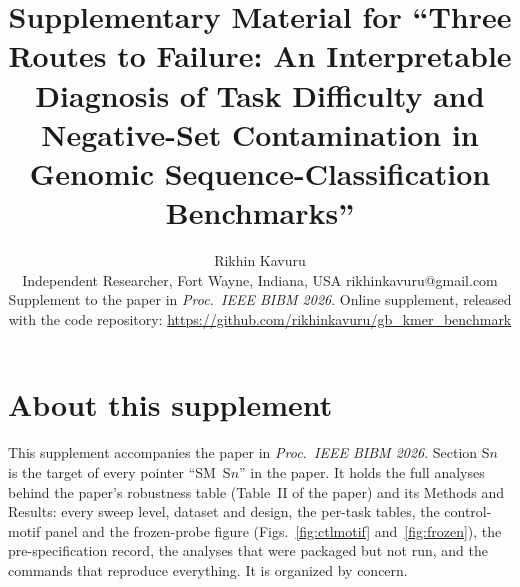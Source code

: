 \documentclass[journal,onecolumn,10pt,letterpaper]{IEEEtran}
\newcommand{\smurl}{\url{https://github.com/rikhinkavuru/gb_kmer_benchmark}}
\begin{document}
\title{Supplementary Material for ``Three Routes to Failure: An Interpretable Diagnosis of Task
Difficulty and Negative-Set Contamination in Genomic Sequence-Classification Benchmarks''}
\author{Rikhin Kavuru\\
\normalsize Independent Researcher, Fort Wayne, Indiana, USA \quad rikhinkavuru@gmail.com\\
\normalsize Supplement to the paper in \emph{Proc.\ IEEE BIBM 2026}. Online supplement, released with the code repository: \smurl}

\maketitle

\section*{About this supplement}

This supplement accompanies the paper in \emph{Proc.\ IEEE BIBM 2026}. Section S$n$ is the target of every
pointer ``SM~S$n$'' in the paper. It holds the full analyses behind the paper's robustness table
(Table~II of the paper) and its Methods and Results: every sweep level, dataset and design, the
per-task tables, the control-motif panel and the frozen-probe figure (Figs.~\ref{fig:ctlmotif}
and~\ref{fig:frozen}), the pre-specification record, the analyses that were packaged but not run, and
the commands that reproduce everything. It is organized by concern.
\end{document}
